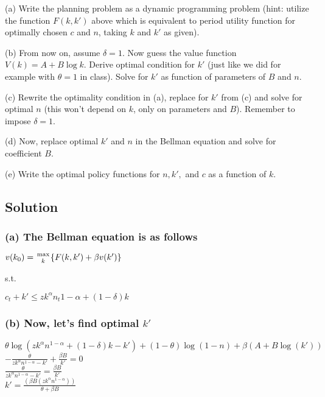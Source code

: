 \documentclass[10pt, a4paper]{article}
\begin{document}
    (a) Write the planning problem as a dynamic programming problem (hint: utilize the function $F(k,k')$ above which is equivalent to period utility function for optimally chosen $c$ and $n$, taking $k$ and $k'$ as given).

    (b) From now on, assume $\delta=1$. Now guess the value function $V(k)=A+B\log k$. Derive optimal condition for $k'$ (just like we did for example with $\theta=1$ in class). Solve for $k'$ as function of parameters of $B$ and $n$.

    (c) Rewrite the optimality condition in (a), replace for $k'$ from (c) and solve for optimal $n$ (this won't depend on $k$, only on parameters and $B$). Remember to impose $\delta=1$.

    (d) Now, replace optimal $k'$ and $n$ in the Bellman equation and solve for coefficient $B$.

    (e) Write the optimal policy functions for $n,k',$ and $c$ as a function of $k$.
  \subsection*{Solution}
    \subsubsection*{(a) The Bellman equation is as follows}
    \begin{center}
      $v(k_0) = {\max\atop{k}}\{F(k,k')+\beta v(k')\}$
    \end{center}
    s.t.
    \begin{center}
      $c_t+k'\leq zk^{\alpha}n_t{1-\alpha}+(1-\delta)k$
    \end{center}
    \subsubsection*{(b) Now, let's find optimal $k'$}
    \begin{center}
      $\theta\log(zk^{\alpha}n^{1-\alpha}+(1-\delta)k-k')+(1-\theta)\log(1-n)+\beta(A+B\log(k'))$ \\
      $-\frac{\theta}{zk^{\alpha}n^{1-\alpha}-k'}+\frac{\beta B}{k'}=0$ \\
      $\frac{\theta}{zk^{\alpha}n^{1-\alpha}-k'}=\frac{\beta B}{k'}$ \\
      $\boxed{k' = \frac{(\beta B(zk^{\alpha}n^{1-\alpha}))}{\theta+\beta B}}$
    \end{center}
\end{document}
